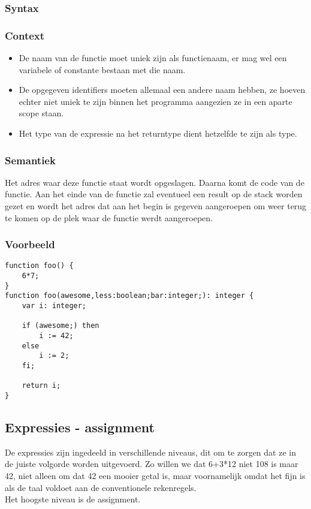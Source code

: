 \documentclass[]{article}
\begin{document}
\subsubsection{Syntax}

\subsubsection{Context}
\begin{itemize}
\item De naam van de functie moet uniek zijn als functienaam, er mag wel een variabele of constante bestaan met die naam.
\item De opgegeven identifiers moeten allemaal een andere naam hebben, ze hoeven echter niet uniek te zijn binnen het programma aangezien ze in een aparte scope staan.
\item Het type van de expressie na het returntype dient hetzelfde te zijn als type.
\end{itemize}
\subsubsection{Semantiek}
Het adres waar deze functie staat wordt opgeslagen. Daarna komt de code van de functie. Aan het einde van de functie zal eventueel een result op de stack worden gezet en wordt het adres dat aan het begin is gegeven aangeroepen om weer terug te komen op de plek waar de functie werdt aangeroepen.
\subsubsection{Voorbeeld}
\begin{lstlisting}[style=SELMA]
function foo() {
	6*7;
}
function foo(awesome,less:boolean;bar:integer;): integer {
	var i: integer;
	
	if (awesome;) then
		i := 42;
	else
		i := 2;
	fi;
	
	return i;
}
\end{lstlisting}


\subsection{Expressies - assignment}
De expressies zijn ingedeeld in verschillende niveaus, dit om te zorgen dat ze in de juiste volgorde worden uitgevoerd. Zo willen we dat 6+3*12 niet 108 is maar 42, niet alleen om dat 42 een mooier getal is, maar voornamelijk omdat het fijn is als de taal voldoet aan de conventionele rekenregels. \\
Het hoogste niveau is de assignment.
\end{document}
